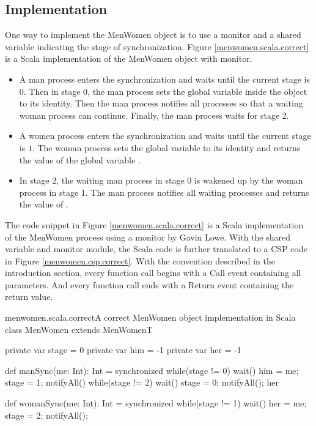 \documentclass[a4paper, 12pt]{article}
\begin{document}
\subsection{Implementation}
One way to implement the MenWomen object is to use a monitor and a shared variable indicating the stage of synchronization. Figure \ref{menwomen.scala.correct} is a Scala implementation of the MenWomen object with monitor.
\begin{itemize}
  \item A man process enters the synchronization and waits until the current stage is $0$. Then in stage $0$, the man process sets the global variable  inside the  object to its identity. Then the man process notifies all processes so that a waiting woman process can continue. Finally, the man process waits for stage 2.
  \item A women process enters the synchronization and waits until the current stage is $1$. The woman process sets the global variable  to its identity and returns the value of the global variable .
  \item In stage $2$, the waiting man process in stage $0$ is wakened up by the woman process in stage $1$. The man process notifies all waiting processes and returns the value of .
\end{itemize}

The code snippet in Figure \ref{menwomen.scala.correct} is a Scala implementation of the MenWomen process using a monitor by Gavin Lowe. With the shared variable and monitor module, the Scala code is further translated to a CSP code in Figure \ref{menwomen.csp.correct}. With the convention described in the introduction section, every function call begins with a Call event containing all parameters. And every function call ends with a Return event containing the return value.

\begin{scalafloat}{menwomen.scala.correct}{A correct MenWomen object implementation in Scala}
class MenWomen extends MenWomenT{
  private var stage = 0
  private var him = -1
  private var her = -1

  def manSync(me: Int): Int = synchronized{
    while(stage != 0) wait()         
    him = me; stage = 1; notifyAll() 
    while(stage != 2) wait()
    stage = 0; notifyAll(); her
  }

  def womanSync(me: Int): Int = synchronized{
    while(stage != 1) wait()
    her = me; stage = 2; notifyAll();
  }
}
\end{scalafloat}
\end{document}
